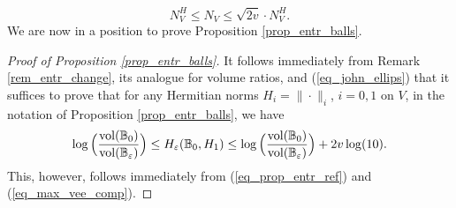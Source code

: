\documentclass[12pt]{article}
\numberwithin{equation}{section}
\theoremstyle{theorem}
\theoremstyle{definition}
\theoremstyle{remark}
\begin{document}
	\begin{equation}\label{eq_john_ellips}
		N_V^H \leq N_V \leq \sqrt{2v} \cdot N_V^H.
	\end{equation}
	We are now in a position to prove Proposition \ref{prop_entr_balls}.
	\begin{proof}[Proof of Proposition \ref{prop_entr_balls}]
		It follows immediately from Remark \ref{rem_entr_change}, its analogue for volume ratios, and (\ref{eq_john_ellips}) that it suffices to prove that for any Hermitian norms $H_i = \| \cdot \|_i$, $i = 0, 1$ on $V$, in the notation of Proposition \ref{prop_entr_balls}, we have
		\begin{equation}
			\log \Big( \frac{{\rm{vol}}(\mathbb{B}_{0})}{{\rm{vol}}(\mathbb{B}_{\varepsilon})} \Big)
			\leq
			H_{\varepsilon}(\mathbb{B}_0, H_1)
			\leq
			\log \Big( \frac{{\rm{vol}}(\mathbb{B}_{0})}{{\rm{vol}}(\mathbb{B}_{\varepsilon})} \Big)
			+
			2v \log(10).
		\end{equation}
		This, however, follows immediately from (\ref{eq_prop_entr_ref}) and (\ref{eq_max_vee_comp}).
	\end{proof}
	
	
\end{document}
